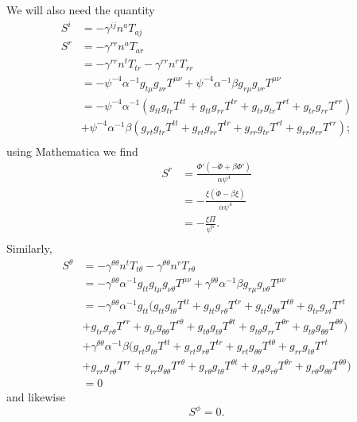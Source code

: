 \documentclass[12pt]{article}
\numberwithin{equation}{section}
\begin{document}
We will also need the quantity
\begin{equation}
\begin{aligned}
S^i &= - \gamma^{ij} n^a T_{aj} \\
S^r &= - \gamma^{rr} n^a T_{a r} \\
&= - \gamma^{rr} n^t T_{t r} - \gamma^{rr} n^r T_{r r} \\
&= - \psi^{-4} \alpha^{-1} g_{t \mu} g_{\nu r} T^{\mu \nu} + \psi^{-4} \alpha^{-1} \beta g_{r \mu} g_{\nu r} T^{\mu \nu} \\
&= - \psi^{-4} \alpha^{-1} (g_{t t} g_{t r} T^{t t} + g_{t t} g_{r r} T^{t r} + g_{t r} g_{t r} T^{r t} + g_{t r} g_{r r} T^{r r}) \\
&+ \psi^{-4} \alpha^{-1} \beta (g_{r t} g_{t r} T^{t t} + g_{r t} g_{r r} T^{t r} + g_{r r} g_{t r} T^{r t} + g_{r r} g_{r r} T^{r r}); \\
\end{aligned}
\end{equation}
using Mathematica we find
\begin{equation}
\begin{aligned}
S^r &= \frac{\Phi' (-\dot{\Phi} + \beta \Phi')}{\alpha \psi^4} \\
&= - \frac{\xi (\dot{\Phi} - \beta \xi)}{\alpha \psi^4} \\
&= - \frac{\xi \Pi}{\psi^6}. \\
\end{aligned}
\end{equation}
Similarly,
\begin{equation}
\begin{aligned}
S^\theta &= - \gamma^{\theta \theta} n^t T_{t \theta} - \gamma^{\theta \theta} n^r T_{r \theta} \\
&= - \gamma^{\theta \theta} \alpha^{-1} g_{tt} g_{t \mu} g_{\nu \theta} T^{\mu \nu} + \gamma^{\theta \theta} \alpha^{-1} \beta g_{r \mu} g_{\nu \theta} T^{\mu \nu} \\
&= - \gamma^{\theta \theta} \alpha^{-1} g_{tt} (g_{t t} g_{t \theta} T^{t t} + g_{t t} g_{r \theta} T^{t r} + g_{t t} g_{\theta \theta} T^{t \theta} + g_{t r} g_{\nu t} T^{r t} \\
&+ g_{t r} g_{r \theta} T^{r r} + g_{t r} g_{\theta \theta} T^{r \theta} + g_{t \theta} g_{t \theta} T^{\theta t} + g_{t \theta} g_{r r} T^{\theta r} + g_{t \theta} g_{\theta \theta} T^{\theta \theta}) \\
&+ \gamma^{\theta \theta} \alpha^{-1} \beta (g_{r t} g_{t \theta} T^{t t} + g_{r t} g_{r \theta} T^{t r} + g_{r t} g_{\theta \theta} T^{t \theta} + g_{r r} g_{t \theta} T^{r t} \\
&+ g_{r r} g_{r \theta} T^{r r} + g_{r r} g_{\theta \theta} T^{r \theta} + g_{r \theta} g_{t \theta} T^{\theta t} + g_{r \theta} g_{r \theta} T^{\theta r} + g_{r \theta} g_{\theta \theta} T^{\theta \theta}) \\
&= 0
\end{aligned}
\end{equation}
and likewise
\begin{equation}
S^\phi = 0.
\end{equation}
\end{document}
